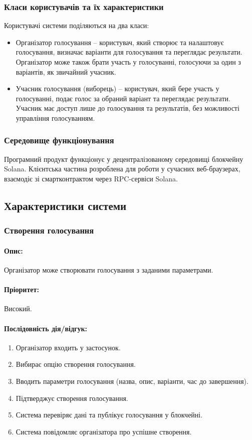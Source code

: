 \documentclass[14pt]{extreport}
\begin{document}
  \subsubsection{Класи користувачів та їх характеристики}
  Користувачі системи поділяються на два класи:
  \begin{itemize}
    \item Організатор голосування – користувач, який створює та налаштовує голосування, визначає варіанти для голосування та переглядає результати. Організатор може також брати участь у голосуванні, голосуючи за один з варіантів, як звичайний учасник.
    \item Учасник голосування (виборець) – користувач, який бере участь у голосуванні, подає голос за обраний варіант та переглядає результати. Учасник має доступ лише до голосування та результатів, без можливості управління голосуванням.
  \end{itemize}
  
  \subsubsection{Середовище функціонування}
  Програмний продукт функціонує у децентралізованому середовищі блокчейну Solana. Клієнтська частина розроблена для роботи у сучасних веб-браузерах, взаємодіє зі смартконтрактом через RPC-сервіси Solana.

  \subsection{Характеристики системи}
  \subsubsection{Створення голосування}  
  \paragraph{Опис:} Організатор може створювати голосування з заданими параметрами.  
  \paragraph{Пріоритет:} Високий.  
  \paragraph{Послідовність дія/відгук:}  
  \begin{enumerate}  
      \item Організатор входить у застосунок.  
      \item Вибирає опцію створення голосування.  
      \item Вводить параметри голосування (назва, опис, варіанти, час до завершення).  
      \item Підтверджує створення голосування.  
      \item Система перевіряє дані та публікує голосування у блокчейні.  
      \item Система повідомляє організатора про успішне створення.  
  \end{enumerate}
\end{document}
